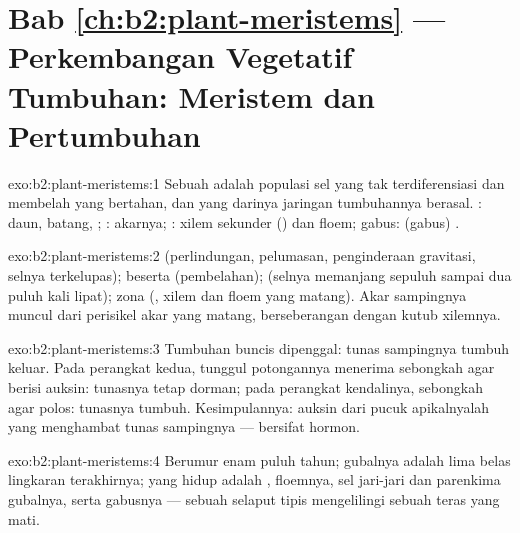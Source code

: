 \section*{Bab \ref{ch:b2:plant-meristems} --- Perkembangan Vegetatif Tumbuhan: Meristem dan Pertumbuhan}

\begin{solution}{exo:b2:plant-meristems:1}
Sebuah  adalah populasi sel yang tak terdiferensiasi dan
membelah yang bertahan, dan yang darinya jaringan tumbuhannya berasal.
: daun, batang, ; :
akarnya; : xilem sekunder () dan floem; 
gabus:  (gabus) .
\end{solution}

\begin{solution}{exo:b2:plant-meristems:2}
 (perlindungan, pelumasan, penginderaan gravitasi, selnya
terkelupas);  beserta  (pembelahan);  (selnya memanjang sepuluh sampai dua puluh kali lipat);
zona  (, xilem dan floem yang matang). Akar
sampingnya muncul dari perisikel akar yang matang, berseberangan dengan
kutub xilemnya.
\end{solution}

\begin{solution}{exo:b2:plant-meristems:3}
Tumbuhan buncis dipenggal: tunas sampingnya tumbuh keluar. Pada
perangkat kedua, tunggul potongannya menerima sebongkah agar berisi
auksin: tunasnya tetap dorman; pada perangkat kendalinya, sebongkah
agar polos: tunasnya tumbuh. Kesimpulannya: auksin dari pucuk
apikalnyalah yang menghambat tunas sampingnya --- 
bersifat hormon.
\end{solution}

\begin{solution}{exo:b2:plant-meristems:4}
Berumur enam puluh tahun;  gubalnya adalah lima belas lingkaran
terakhirnya; yang hidup adalah , floemnya, sel jari-jari dan
parenkima  gubalnya, serta  gabusnya --- sebuah selaput
tipis mengelilingi sebuah teras yang mati.
\end{solution}

